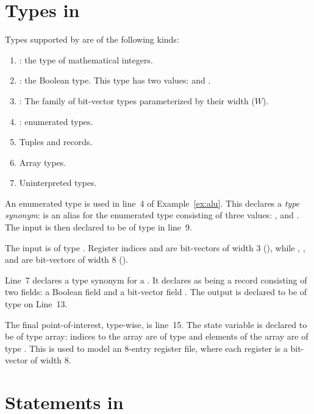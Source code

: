\section{Types in \uclid{}}

Types supported by \uclid{} are of the following kinds: 
\begin{enumerate}
    \item {}: the type of mathematical integers.
    \item {}: the Boolean type. This type has two values:  and .
    \item {}: The family of bit-vector types parameterized by their width ($W$).
    \item {}: enumerated types.
    \item Tuples and records.
    \item Array types.
    \item Uninterpreted types.
\end{enumerate}

An enumerated type is used in line~4 of Example~\ref{ex:alu}. This declares a \textit{type synonym}:  is an alias for the enumerated type consisting of three values: ,  and . The input  is then declared to be of type  in line~9. 

The input  is of type . Register indices  and  are bit-vectors of width 3 (), while , ,  and  are bit-vectors of width 8 ().

Line~7 declares a type synonym for a . It declares  as being a record consisting of two fields: a Boolean field  and a bit-vector field . The output  is declared to be of type  on Line~13.

The final point-of-interest, type-wise, is line~15. The state variable  is declared to be of type array: indices to the array are of type  and elements of the array are of type . This is used to model an 8-entry register file, where each register is a bit-vector of width 8.

\section{Statements in \uclid{}}

